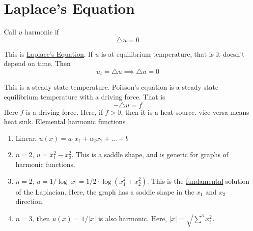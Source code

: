 \documentclass{article}
\newtheorem{one minute paper}[theorem]{One Minute Paper}
\begin{document}
\section*{Laplace's Equation}

Call $u$ harmonic if 
\begin{equation}
    \triangle u = 0
\end{equation}

This is \underline{Laplace's Equation}. If $u$ is at equilibrium temperature, that is it doesn't depend on time. Then 
\begin{equation}
    u_t = \triangle u \implies \triangle u = 0
\end{equation}

This is a steady state temperature. Poisson's equation is a steady state equilibrium temperature with a driving force. That is 
\begin{equation}
    -\triangle u = f
\end{equation}
Here $f$ is a driving force. Here, if $f > 0$, then it is a heat source. vice versa means heat sink. Elemental harmonic functions
\begin{enumerate}
    \item Linear, $u(x) = a_1x_1 + a_2x_2 + \dots + b$
    \item $n=2$, $u=x_1^2 - x_2^2$. This is a saddle shape, and is generic for graphs of harmonic functions.
    \item $n=2$, $u= 1/\log|x| = 1/2 \cdot \log(x_1^2 + x_2^2)$. This is the \underline{fundamental} solution of the Laplacian. Here, the graph has a saddle shape in the $x_1$ and $x_2$ direction. 
    \item $n=3$, then $u(x) = 1/|x|$ is also harmonic. Here, $|x| = \sqrt{\sum^3 x_i^2}$. 
\end{enumerate}
\end{document}
